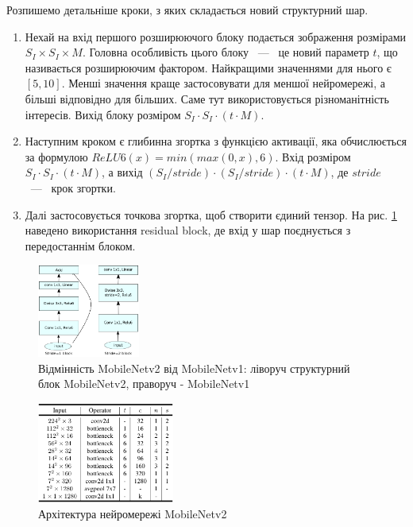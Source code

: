 Розпишемо детальніше кроки, з яких складається новий структурний шар.
\begin{enumerate}
    \item Нехай на вхід першого розширюючого блоку подається зображення розмірами $S_I \times S_I \times M$.
          Головна особливість цього блоку ~---~ це новий параметр $t$, що називається розширюючим фактором.
          Найкращими значеннями для нього є $[5,10]$. Менші значення краще застосовувати для меншої нейромережі,
          а більші відповідно для більших. Саме тут використовується різноманітність інтересів.
          Вихід блоку розміром $S_I \cdot  S_I \cdot  (t\cdot M)$.
    \item Наступним кроком є глибинна згортка з функцією активації,
          яка обчислюється за формулою $ReLU6(x) =  min(max(0,x),6)$.
          Вхід розміром $S_I \cdot  S_I \cdot  (t\cdot M)$, а вихід $(S_I/stride) \cdot  (S_I/stride) \cdot  (t\cdot M)$,
          де  $stride$ ~---~ крок згортки.
    \item Далі застосовується точкова згортка, щоб створити єдиний тензор. На
          рис. \ref{fig:cnn:mobilenetv2_layer} наведено використання residual block, де вхід у шар
          поєднується з передостаннім блоком.
\end{enumerate}
\begin{figure}[H]
    \centering
    \includegraphics[width=0.3\textwidth]{images/cnn_mobilenetv2_layer}
    \caption{Відмінність MobileNetv2 від MobileNetv1: ліворуч структурний блок MobileNetv2,
        праворуч - MobileNetv1   \cite{mobilenetv2}
        \label{fig:cnn:mobilenetv2_layer}
    }
\end{figure}

\begin{figure}[H]
    \centering
    \includegraphics[width=0.4\textwidth]{images/cnn_mobilenetv2_architecture}
    \caption{Архітектура нейромережі MobileNetv2     \cite{mobilenetv2}
        \label{fig:cnn:mobilenetv2_architecture}
    }
\end{figure}

